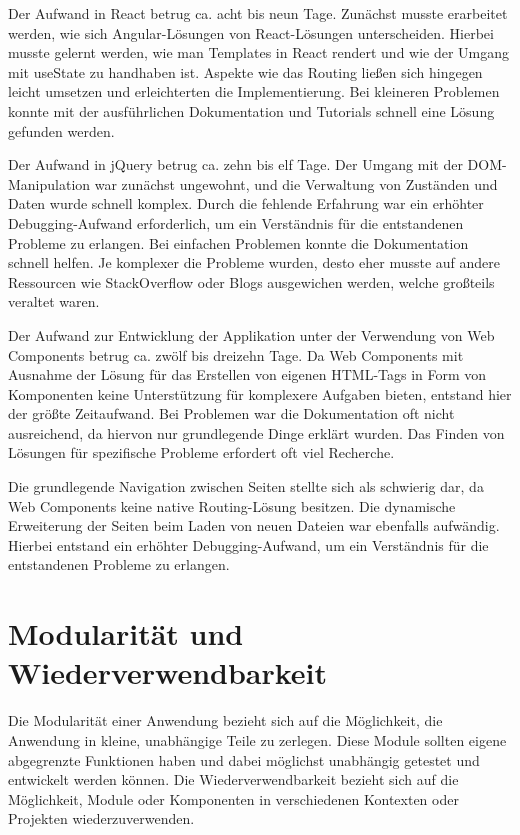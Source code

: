 \documentclass[oneside]{ausarbeitung}
\begin{document}
Der Aufwand in React betrug ca. acht bis neun Tage. Zunächst musste erarbeitet werden, wie sich Angular-Lösungen von React-Lösungen unterscheiden. Hierbei musste gelernt werden, wie man Templates in React rendert und wie der Umgang mit useState zu handhaben ist. Aspekte wie das Routing ließen sich hingegen leicht umsetzen und erleichterten die Implementierung. Bei kleineren Problemen konnte mit der ausführlichen Dokumentation und Tutorials schnell eine Lösung gefunden werden.

Der Aufwand in jQuery betrug ca. zehn bis elf Tage. Der Umgang mit der DOM-Manipulation war zunächst ungewohnt, und die Verwaltung von Zuständen und Daten wurde schnell komplex. Durch die fehlende Erfahrung war ein erhöhter Debugging-Aufwand erforderlich, um ein Verständnis für die entstandenen Probleme zu erlangen. Bei einfachen Problemen konnte die Dokumentation schnell helfen. Je komplexer die Probleme wurden, desto eher musste auf andere Ressourcen wie StackOverflow oder Blogs ausgewichen werden, welche großteils veraltet waren.  

Der Aufwand zur Entwicklung der Applikation unter der Verwendung von Web Components betrug ca. zwölf bis dreizehn Tage. Da Web Components mit Ausnahme der Lösung für das Erstellen von eigenen \ac{HTML}-Tags in Form von Komponenten keine Unterstützung für komplexere Aufgaben bieten, entstand hier der größte Zeitaufwand. Bei Problemen war die Dokumentation oft nicht ausreichend, da hiervon nur grundlegende Dinge erklärt wurden. Das Finden von Lösungen für spezifische Probleme erfordert oft viel Recherche.

Die grundlegende Navigation zwischen Seiten stellte sich als schwierig dar, da Web Components keine native Routing-Lösung besitzen. Die dynamische Erweiterung der Seiten beim Laden von neuen Dateien war ebenfalls aufwändig. Hierbei entstand ein erhöhter Debugging-Aufwand, um ein Verständnis für die entstandenen Probleme zu erlangen.

\section{Modularität und Wiederverwendbarkeit}

Die Modularität einer Anwendung bezieht sich auf die Möglichkeit, die Anwendung in kleine, unabhängige Teile zu zerlegen. Diese Module sollten eigene abgegrenzte Funktionen haben und dabei möglichst unabhängig getestet und entwickelt werden können. 
Die Wiederverwendbarkeit bezieht sich auf die Möglichkeit, Module oder Komponenten in verschiedenen Kontexten oder Projekten wiederzuverwenden. 
\end{document}
